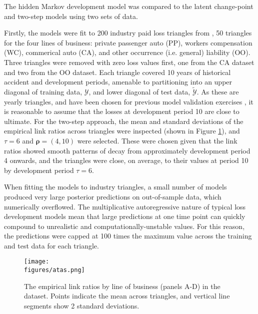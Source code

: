 The hidden Markov development model was compared to
the latent change-point and two-step models 
using two sets of data.

Firstly, the models were fit to 200 industry
paid loss triangles from \cite{meyers2015}, 50 triangles
for the four lines of business: private passenger auto (PP),
workers compensation (WC), commerical auto (CA), and
other occurrence (i.e. general) liability (OO).
Three triangles were removed with zero loss values first,
one from the CA dataset and two from the OO dataset.
Each triangle covered 10 years of historical
accident and development periods, amenable to partitioning
into an upper diagonal of training data,
$\mathcal{Y}$, and lower diagonal of test data,
$\tilde{\mathcal{Y}}$.
As these are yearly triangles, and have been
chosen for previous model validation exercises \citep{meyers2015},
it is reasonable to assume that the losses at development
period 10 are close to ultimate.
For the two-step approach, the
mean and standard deviations of the empirical
link ratios across triangles were inspected (shown in Figure
\ref{fig:industry-atas}), and 
$\tau = 6$ and $\bm{\rho} = (4, 10)$ were selected. These
were chosen given
that the link ratios showed smooth patterns
of decay from approximately development period
4 onwards, and the
triangles were close, on average, to their values
at period 10 by development period $\tau = 6$.

When fitting the models to industry triangles,
a small number of models
produced
very large posterior predictions on out-of-sample
data, which numerically overflowed. The multiplicative
autoregressive nature of typical loss development models
mean that large predictions at one
time point can quickly compound to unrealistic and
computationally-unstable values. For this reason,
the predictions were capped at 100 times the
maximum value across the training and test data
for each triangle.

\begin{figure}
    \centering
    \texttt{[image: \\figures/atas.png]}
    \caption{
        The empirical link ratios by line of business 
		(panels A-D) in
        the \cite{meyers2015} dataset.
        Points indicate the mean across triangles,
        and vertical line segments show 2 standard
        deviations.
    }
	\label{fig:industry-atas}
\end{figure}

